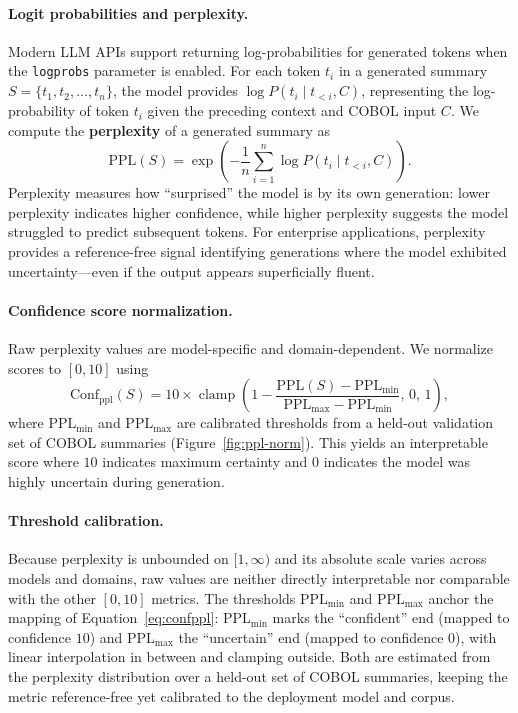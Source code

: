 \paragraph{Logit probabilities and perplexity.}
Modern LLM APIs support returning log-probabilities for generated tokens when the
\texttt{logprobs} parameter is enabled. For each token $t_i$ in a generated summary
$S = \{t_1, t_2, \dots, t_n\}$, the model provides $\log P(t_i \mid t_{<i}, C)$,
representing the log-probability of token $t_i$ given the preceding context and COBOL
input $C$. We compute the \textbf{perplexity} of a generated summary as
\begin{equation}
\mathrm{PPL}(S) = \exp\!\left(-\frac{1}{n}\sum_{i=1}^{n}\log P(t_i \mid t_{<i}, C)\right).
\label{eq:ppl}
\end{equation}
Perplexity measures how ``surprised'' the model is by its own generation: lower perplexity
indicates higher confidence, while higher perplexity suggests the model struggled to
predict subsequent tokens. For enterprise applications, perplexity provides a
reference-free signal identifying generations where the model exhibited
uncertainty---even if the output appears superficially fluent.

\paragraph{Confidence score normalization.}
Raw perplexity values are model-specific and domain-dependent. We normalize scores to
$[0,10]$ using
\begin{equation}
\mathrm{Conf}_{\mathrm{ppl}}(S) = 10 \times \operatorname{clamp}\!\left(
1 - \frac{\mathrm{PPL}(S) - \mathrm{PPL}_{\min}}{\mathrm{PPL}_{\max} - \mathrm{PPL}_{\min}},\,
0,\, 1\right),
\label{eq:confppl}
\end{equation}
where $\mathrm{PPL}_{\min}$ and $\mathrm{PPL}_{\max}$ are calibrated thresholds from a
held-out validation set of COBOL summaries (Figure~\ref{fig:ppl-norm}). This yields an
interpretable score where $10$ indicates maximum certainty and $0$ indicates the model was
highly uncertain during generation.

\paragraph{Threshold calibration.}
Because perplexity is unbounded on $[1,\infty)$ and its absolute scale varies across
models and domains, raw values are neither directly interpretable nor comparable with the
other $[0,10]$ metrics. The thresholds $\mathrm{PPL}_{\min}$ and $\mathrm{PPL}_{\max}$
anchor the mapping of Equation~\eqref{eq:confppl}: $\mathrm{PPL}_{\min}$ marks the
``confident'' end (mapped to confidence $10$) and $\mathrm{PPL}_{\max}$ the ``uncertain''
end (mapped to confidence $0$), with linear interpolation in between and clamping outside.
Both are estimated from the perplexity distribution over a held-out set of COBOL summaries,
keeping the metric reference-free yet calibrated to the deployment model and corpus.


